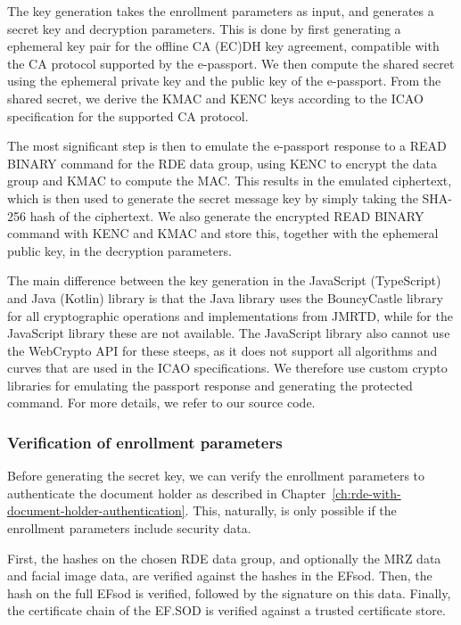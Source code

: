 The key generation takes the enrollment parameters as input, and generates a secret key and decryption parameters.
This is done by first generating a ephemeral key pair for the offline CA (EC)DH key agreement, compatible with the CA protocol supported by the e-passport.
We then compute the shared secret using the ephemeral private key and the public key of the e-passport.
From the shared secret, we derive the KMAC and KENC keys according to the ICAO specification for the supported CA protocol.

The most significant step is then to emulate the e-passport response to a READ BINARY command for the RDE data group, using KENC to encrypt the data group and KMAC to compute the MAC.
This results in the emulated ciphertext, which is then used to generate the secret message key by simply taking the SHA-256 hash of the ciphertext.
We also generate the encrypted READ BINARY command with KENC and KMAC and store this, together with the ephemeral public key, in the decryption parameters.

The main difference between the key generation in the JavaScript (TypeScript) and Java (Kotlin) library is that the Java library uses the BouncyCastle library for all cryptographic operations and implementations from JMRTD, while for the JavaScript library these are not available.
The JavaScript library also cannot use the WebCrypto API for these steeps, as it does not support all algorithms and curves that are used in the ICAO specifications.
We therefore use custom crypto libraries for emulating the passport response and generating the protected command.
For more details, we refer to our source code.

\subsubsection{Verification of enrollment parameters}\label{subsubsec:verification-of-enrollment-parameters}
Before generating the secret key, we can verify the enrollment parameters to authenticate the document holder as described in Chapter~\ref{ch:rde-with-document-holder-authentication}.
This, naturally, is only possible if the enrollment parameters include security data.

First, the hashes on the chosen RDE data group, and optionally the MRZ data and facial image data, are verified against the hashes in the EFsod.
Then, the hash on the full EFsod is verified, followed by the signature on this data.
Finally, the certificate chain of the EF.SOD is verified against a trusted certificate store.

